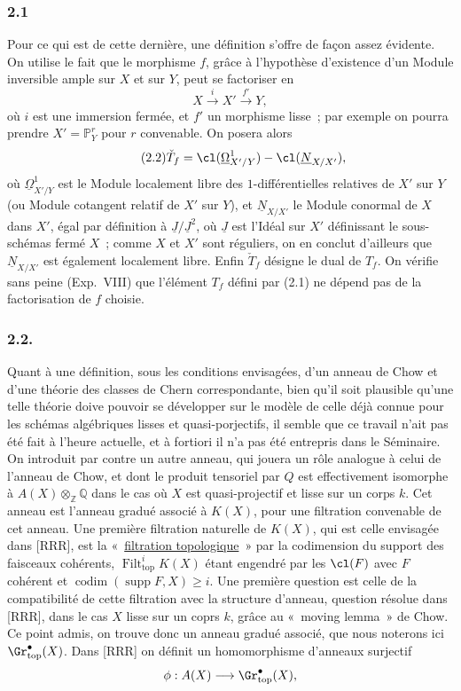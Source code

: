 \subsubsection*{2.1}
Pour ce qui est de cette dernière, une définition s'offre de façon assez évidente. On utilise le fait que le morphisme $f$, grâce à l'hypothèse d'existence d'un Module inversible ample sur $X$ et sur $Y$, peut se factoriser en
\begin{equation}\tag{2.1}
X\xrightarrow{i}X'\xrightarrow{f'}Y,
\end{equation}
où $i$ est une immersion fermée, et $f'$ un morphisme lisse~; par exemple on pourra prendre $X'=\mathbb P^r_Y$ pour $r$ convenable. On posera alors
\begin{equation}\tag{2.2}
\check T_f=\cl({\underline\Omega}^1_{X'/Y})-\cl({\underline N}_{X/X'}),
\end{equation}
où ${\underline\Omega}^1_{X'/Y}$ est le Module localement libre des $1$-différentielles relatives de $X'$ sur $Y$ (ou Module cotangent relatif de $X'$ sur $Y$), et ${\underline N}_{X/X'}$ le Module conormal de $X$ dans $X'$, égal par définition à ${\underline J}/{\underline J}^2$, où ${\underline J}$ est l'Idéal sur $X'$ définissant le sous-schémas fermé $X$~; comme $X$ et $X'$ sont réguliers, on en conclut d'ailleurs que ${\underline N}_{X/X'}$ est également localement libre. Enfin $\check T_f$ désigne le dual de $T_f$. On vérifie sans peine (Exp.\ VIII) que l'élément $T_f$ défini par (2.1) ne dépend pas de la factorisation de $f$ choisie.

\subsubsection*{2.2.}
Quant à une définition, sous les conditions envisagées, d'un anneau de Chow et d'une théorie des classes de Chern correspondante, bien qu'il soit plausible qu'une telle théorie doive pouvoir se développer sur le modèle de celle déjà connue pour les schémas algébriques lisses et quasi-porjectifs, il semble que ce travail n'ait pas été fait à l'heure actuelle, et à fortiori il n'a pas été entrepris dans le Séminaire. On introduit par contre un autre anneau, qui jouera un rôle analogue à celui de l'anneau de Chow, et dont le produit tensoriel par $Q$ est effectivement isomorphe à $A(X)\otimes_{\mathbb Z}\mathbb Q$ dans le cas où $X$ est quasi-projectif et lisse sur un corps $k$. Cet anneau est l'anneau gradué associé à $K(X)$, pour une filtration convenable de cet anneau. Une première filtration naturelle de $K(X)$, qui est celle envisagée dans [RRR], est la «~\underline{filtration topologique}~» par la codimension du support des faisceaux cohérents, $\operatorname{Filt}^{i}_{\mathrm{top}}K(X)$ étant engendré par les $\cl(F)$ avec $F$ cohérent et $\operatorname{codim}(\operatorname{supp}F,X)\ge i$. Une première question est celle de la compatibilité de cette filtration avec la structure d'anneau, question résolue dans [RRR], dans le cas $X$ lisse sur un coprs $k$, grâce au «~moving lemma~» de Chow. Ce point admis, on trouve donc un anneau gradué associé, que nous noterons ici $\Gr^{\bullet}_{\mathrm{top}}(X)$. Dans [RRR] on définit un homomorphisme d'anneaux surjectif
\[
\phi:A(X)\longrightarrow \Gr^{\bullet}_{\mathrm{top}}(X),
\]
